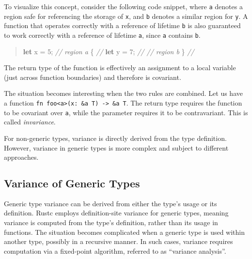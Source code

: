 \documentclass[
  11pt,
  twoside,symmetric]{report}
\newenvironment{Shaded}{}{}
\newcommand{\CommentTok}[1]{\textit{#1}}
\newcommand{\DecValTok}[1]{#1}
\newcommand{\KeywordTok}[1]{\textbf{#1}}
\newcommand{\NormalTok}[1]{#1}
\newcommand{\OperatorTok}[1]{#1}
\begin{document}
To visualize this concept, consider the following code snippet, where
\texttt{\textquotesingle{}a} denotes a region safe for referencing the
storage of \texttt{x}, and \texttt{\textquotesingle{}b} denotes a
similar region for \texttt{y}. A function that operates correctly with a
reference of lifetime \texttt{\textquotesingle{}b} is also guaranteed to
work correctly with a reference of lifetime
\texttt{\textquotesingle{}a}, since \texttt{\textquotesingle{}a}
contains \texttt{\textquotesingle{}b}.

\begin{quote}
\begin{Shaded}
\begin{Highlighting}[]
 \KeywordTok{let}\NormalTok{ x }\OperatorTok{=} \DecValTok{5}\OperatorTok{;}        \CommentTok{// region \textquotesingle{}a}
 \OperatorTok{\{}                 \CommentTok{//}
     \KeywordTok{let}\NormalTok{ y }\OperatorTok{=} \DecValTok{7}\OperatorTok{;}    \CommentTok{//            // region \textquotesingle{}b        }
 \OperatorTok{\}}                 \CommentTok{//}
\end{Highlighting}
\end{Shaded}
\end{quote}

The return type of the function is effectively an assignment to a local
variable (just across function boundaries) and therefore is covariant.

The situation becomes interesting when the two rules are combined. Let
us have a function
\texttt{fn\ foo\textless{}\textquotesingle{}a\textgreater{}(x:\ \&\textquotesingle{}a\ T)\ -\textgreater{}\ \&\textquotesingle{}a\ T}.
The return type requires the function to be covariant over
\texttt{\textquotesingle{}a}, while the parameter requires it to be
contravariant. This is called \emph{invariance}.

For non-generic types, variance is directly derived from the type
definition. However, variance in generic types is more complex and
subject to different approaches.

\subsection{Variance of Generic
Types}\label{sec:variance-of-generic-types}

Generic type variance can be derived from either the type's usage or its
definition. Rustc employs
definition-site variance for generic types, meaning variance is computed
from the type's definition, rather than its usage in functions. The
situation becomes complicated when a generic type is used within another
type, possibly in a recursive manner. In such cases, variance requires
computation via a fixed-point algorithm, referred to as ``variance
analysis''.
\end{document}

